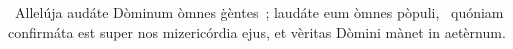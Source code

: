 {~Allelúja}
{%
audáte Dòminum òmnes ġèntes~; laudáte eum òmnes pòpuli,
~quóniam confirmáta est super nos mizericórdia ejus, et vèritas Dòmini mànet in aetèrnum.
}

